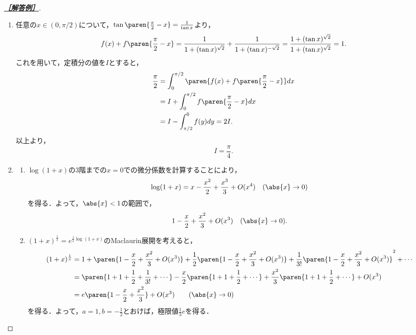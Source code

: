 \documentclass[uplatex,dvipdfmx]{jsarticle}
\begin{document}
\begin{proof}[\textbf{\underline{［解答例］}}]\mbox{}
    \begin{enumerate}[{問}1]
        \item 任意の$x\in(0,\pi/2)$について，$\tan\paren{\frac{\pi}{2}-x}=\frac{1}{\tan x}$より，
        \[f(x)+f\paren{\frac{\pi}{2}-x}=\frac{1}{1+(\tan x)^{\sqrt{2}}}+\frac{1}{1+(\tan x)^{-\sqrt{2}}}=\frac{1+(\tan x)^{\sqrt{2}}}{1+(\tan x)^{\sqrt{2}}}=1.\]
        これを用いて，定積分の値を$I$とすると，
        \begin{align*}
            \frac{\pi}{2}&=\int^{\pi/2}_0\paren{f(x)+f\paren{\frac{\pi}{2}-x}}dx\\
            &=I+\int^{\pi/2}_0f\paren{\frac{\pi}{2}-x}dx\\
            &=I-\int^0_{\pi/2}f(y)dy=2I.
        \end{align*}
        以上より，
        \[I=\frac{\pi}{4}.\]
        \item \begin{enumerate}
            \item $\log(1+x)$の3階までの$x=0$での微分係数を計算することにより，
            \[\log(1+x)=x-\frac{x^2}{2}+\frac{x^3}{3}+O(x^4)\quad(\abs{x}\to0)\]
            を得る．よって，$\abs{x}<1$の範囲で，
            \[1-\frac{x}{2}+\frac{x^2}{3}+O(x^3)\quad(\abs{x}\to0).\]
            \item $(1+x)^{\frac{1}{x}}=e^{\frac{1}{x}\log(1+x)}$のMaclaurin展開を考えると，
            \begin{align*}
                (1+x)^{\frac{1}{x}}&=1+\paren{1-\frac{x}{2}+\frac{x^2}{3}+O(x^3)}+\frac{1}{2}\paren{1-\frac{x}{2}+\frac{x^2}{3}+O(x^3)}+\frac{1}{3!}\paren{1-\frac{x}{2}+\frac{x^2}{3}+O(x^3)}^2+\cdots\\
                &=\paren{1+1+\frac{1}{2}+\frac{1}{3!}+\cdots}-\frac{x}{2}\paren{1+1+\frac{1}{2}+\cdots}+\frac{x^2}{3}\paren{1+1+\frac{1}{2}+\cdots}+O(x^3)\\
                &=e\paren{1-\frac{x}{2}+\frac{x^2}{3}}+O(x^3)\qquad(\abs{x}\to0)
            \end{align*}
            を得る．よって，$a=1,b=-\frac{1}{2}$とおけば，極限値$\frac{1}{3}e$を得る．
        \end{enumerate}
    \end{enumerate}
\end{proof}
\end{document}
